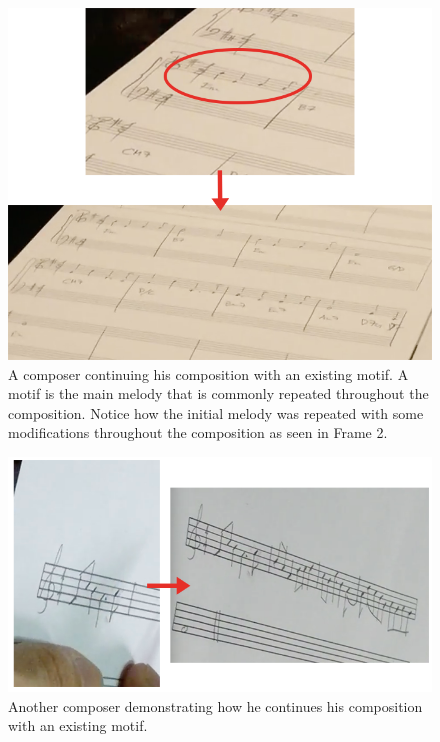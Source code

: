 		\begin{figure}[H]
			\centering
			\includegraphics[scale=0.52]{figures/motif-magsalin.png}
		    \caption{A composer continuing his composition with an existing motif. A motif is the main melody that is commonly repeated throughout the composition. Notice how the initial melody was repeated with some modifications throughout the composition as seen in Frame 2.}
		    \label{fig:motif-magsalin}
		\end{figure}

		\begin{figure}[H]
			\centering
			\includegraphics[scale=0.6]{figures/motif-anthony.png}
		    \caption{Another composer demonstrating how he continues his composition with an existing motif.}
		    \label{fig:motif-anthony}
		\end{figure}

